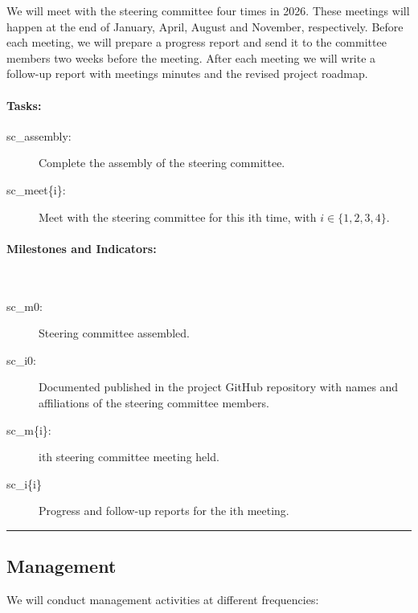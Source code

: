 We will meet with the steering committee four times in 2026. These meetings
will happen at the end of January, April, August and November, respectively.
%
Before each meeting, we will prepare a progress report and send it to the
committee members two weeks before the meeting. After each meeting we will
write a follow-up report with meetings minutes and the revised project roadmap.

\paragraph{Tasks:}

\begin{description}

    \item[sc\_assembly:] Complete the assembly of the steering committee.

    \item[sc\_meet\{i\}:] Meet with the steering committee for this ith
        time, with $i\in\{1,2,3,4\}$.

\end{description}

\paragraph{Milestones and Indicators:}\mbox{}\\

\begin{description}

    \item[sc\_m0:] Steering committee assembled.

    \item[sc\_i0:] Documented published in the project GitHub repository with
        names and affiliations of the steering committee members.

    \item[sc\_m\{i\}:] ith steering committee meeting held.

    \item[sc\_i\{i\}] Progress and follow-up reports for the ith meeting.

\end{description}

\noindent\rule{\textwidth}{1pt}
\subsection{Management}

We will conduct management activities at different frequencies:

